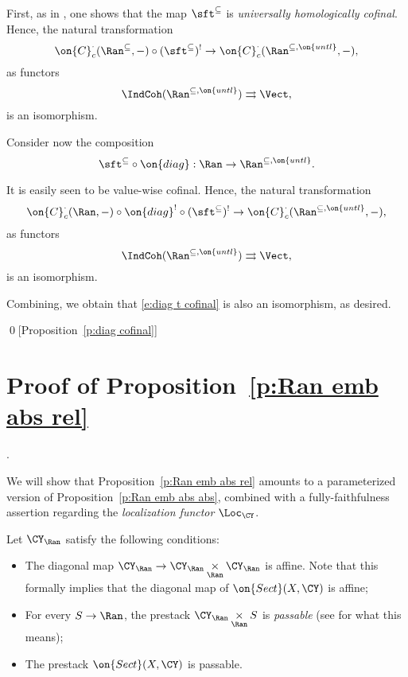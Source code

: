 \documentclass[9pt]{amsart}
\theoremstyle{remark}
\theoremstyle{definition}
\theoremstyle{remark}
\newcommand{\propref}[1]{Proposition~\ref{#1}}
\numberwithin{equation}{section}
\begin{document}
\medskip

First, as in \cite[Theorem 4.6.2]{Ga4}, one shows that the map $\sft^{\subseteq}$ is \emph{universally homologically cofinal}. Hence, 
the natural transformation
$$\on{C}^\cdot_c(\Ran^{\subseteq},-)\circ (\sft^{\subseteq})^!\to \on{C}^\cdot_c(\Ran^{\subseteq,\on{untl}},-),$$
as functors
$$\IndCoh(\Ran^{\subseteq,\on{untl}})\rightrightarrows \Vect,$$
is an isomorphism.

\medskip

Consider now the composition
$$\sft^{\subseteq}\circ \on{diag}:\Ran\to \Ran^{\subseteq,\on{untl}}.$$

It is easily seen to be value-wise cofinal. Hence, the natural transformation
$$\on{C}^\cdot_c(\Ran,-)\circ \on{diag}^! \circ (\sft^{\subseteq})^!\to \on{C}^\cdot_c(\Ran^{\subseteq,\on{untl}},-),$$
as functors
$$\IndCoh(\Ran^{\subseteq,\on{untl}})\rightrightarrows \Vect,$$
is an isomorphism.

\medskip

Combining, we obtain that \eqref{e:diag t cofinal} is also an isomorphism, as desired. 

\qed[\propref{p:diag cofinal}]

\section{Proof of \propref{p:Ran emb abs rel}}. \label{s:proof of Ran emb abs rel}

We will show that \propref{p:Ran emb abs rel} amounts to a parameterized version of 
\propref{p:Ran emb abs abs}, combined with a fully-faithfulness assertion regarding the
\emph{localization functor} $\Loc_\CY$. 


\sssec{} \label{sss:good D stacks}

Let $\CY_\Ran$ satisfy the following conditions:

\begin{itemize}

\item The diagonal map $\CY_\Ran\to \CY_\Ran\underset{\Ran}\times  \CY_\Ran$ is affine. 
Note that this formally implies that the diagonal map of $\on{Sect}(X,\CY)$ is affine;

\medskip

\item For every $S\to \Ran$, the prestack $\CY_\Ran\underset{\Ran}\times S$ is 
\emph{passable} (see \cite[Chapter 3, Sect. 3.5.1]{GaRo2} for what this means);

\smallskip

\item The prestack $\on{Sect}(X,\CY)$ is passable.

\end{itemize}
\end{document}
